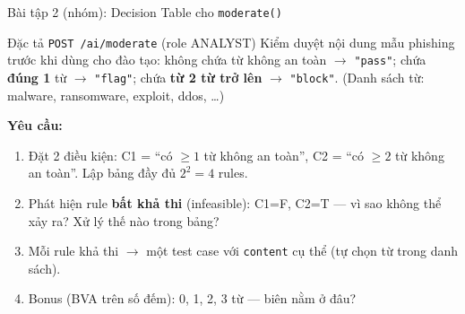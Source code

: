 \documentclass[aspectratio=169,12pt]{beamer}
\begin{document}
\begin{frame}[shrink=6]{Bài tập 2 (nhóm): Decision Table cho \texttt{moderate()}}
  \begin{block}{Đặc tả \texttt{POST /ai/moderate} (role ANALYST)}
    Kiểm duyệt nội dung mẫu phishing trước khi dùng cho đào tạo:
    không chứa từ không an toàn $\to$ \texttt{"pass"};
    chứa \textbf{đúng 1} từ $\to$ \texttt{"flag"};
    chứa \textbf{từ 2 từ trở lên} $\to$ \texttt{"block"}.
    (Danh sách từ: malware, ransomware, exploit, ddos, \ldots)
  \end{block}

  \vspace{0.2em}
  \small
  \textbf{Yêu cầu:}
  \begin{enumerate}
    \item Đặt 2 điều kiện: C1 = ``có $\geq 1$ từ không an toàn'',
      C2 = ``có $\geq 2$ từ không an toàn''. Lập bảng đầy đủ $2^2 = 4$ rules.
    \item Phát hiện rule \textbf{bất khả thi} (infeasible): C1=F, C2=T
      --- vì sao không thể xảy ra? Xử lý thế nào trong bảng?
    \item Mỗi rule khả thi $\to$ một test case với \texttt{content} cụ thể
      (tự chọn từ trong danh sách).
    \item Bonus (BVA trên số đếm): 0, 1, 2, 3 từ --- biên nằm ở đâu?
  \end{enumerate}
\end{frame}
\end{document}

